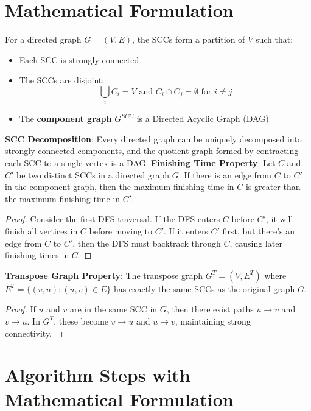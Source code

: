 \documentclass{book}
\theoremstyle{definition}
\begin{document}
\section{Mathematical Formulation}

For a directed graph $G = (V, E)$, the SCCs form a partition of $V$ such that:
\begin{itemize}
    \item Each SCC is strongly connected
    \item The SCCs are disjoint: 
    $$\bigcup_{i} C_i = V \text{ and } C_i \cap C_j = \emptyset \text{ for } i \neq j$$
    \item The \textbf{component graph} $G^{SCC}$ is a Directed Acyclic Graph (DAG)
\end{itemize}

\textbf{SCC Decomposition}: Every directed graph can be uniquely decomposed into strongly connected components, and the quotient graph formed by contracting each SCC to a single vertex is a DAG.
\textbf{Finishing Time Property}: Let $C$ and $C'$ be two distinct SCCs in a directed graph $G$. If there is an edge from $C$ to $C'$ in the component graph, then the maximum finishing time in $C$ is greater than the maximum finishing time in $C'$.


\begin{proof}
Consider the first DFS traversal. If the DFS enters $C$ before $C'$, it will finish all vertices in $C$ before moving to $C'$. If it enters $C'$ first, but there's an edge from $C$ to $C'$, then the DFS must backtrack through $C$, causing later finishing times in $C$.
\end{proof}

\textbf{Transpose Graph Property}: The transpose graph $G^T = (V, E^T)$ where $E^T = \{(v, u) : (u, v) \in E\}$ has exactly the same SCCs as the original graph $G$.


\begin{proof}
If $u$ and $v$ are in the same SCC in $G$, then there exist paths $u \to  v$ and $v \to  u$. In $G^T$, these become $v \to  u$ and $u \to  v$, maintaining strong connectivity.
\end{proof}

\section{Algorithm Steps with Mathematical Formulation}
\end{document}
